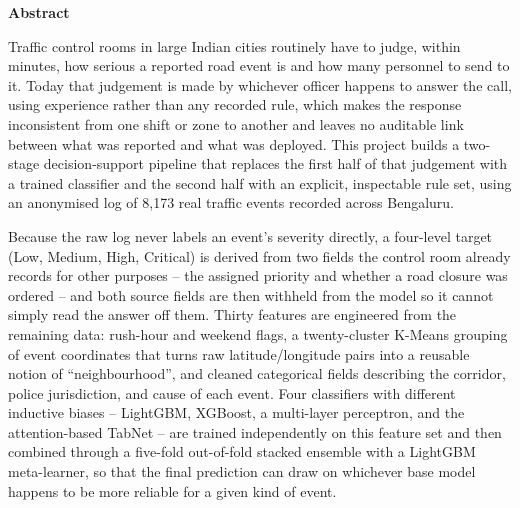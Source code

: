 \documentclass[12pt,phd,times]{pkmthesis}
\begin{document}
\thispagestyle{empty}
%
{\renewcommand{\baselinestretch}{1.5}
{%
\begin{center}
	{\bf{Abstract}}
\end{center}
{\em{\noindent
Traffic control rooms in large Indian cities routinely have to judge, within minutes, how serious a reported road event is and how many personnel to send to it. Today that judgement is made by whichever officer happens to answer the call, using experience rather than any recorded rule, which makes the response inconsistent from one shift or zone to another and leaves no auditable link between what was reported and what was deployed. This project builds a two-stage decision-support pipeline that replaces the first half of that judgement with a trained classifier and the second half with an explicit, inspectable rule set, using an anonymised log of 8{,}173 real traffic events recorded across Bengaluru.

\vspace{0.3cm}
Because the raw log never labels an event's severity directly, a four-level target (Low, Medium, High, Critical) is derived from two fields the control room already records for other purposes -- the assigned priority and whether a road closure was ordered -- and both source fields are then withheld from the model so it cannot simply read the answer off them. Thirty features are engineered from the remaining data: rush-hour and weekend flags, a twenty-cluster K-Means grouping of event coordinates that turns raw latitude/longitude pairs into a reusable notion of ``neighbourhood'', and cleaned categorical fields describing the corridor, police jurisdiction, and cause of each event. Four classifiers with different inductive biases -- LightGBM, XGBoost, a multi-layer perceptron, and the attention-based TabNet -- are trained independently on this feature set and then combined through a five-fold out-of-fold stacked ensemble with a LightGBM meta-learner, so that the final prediction can draw on whichever base model happens to be more reliable for a given kind of event.

}}}}
\end{document}
